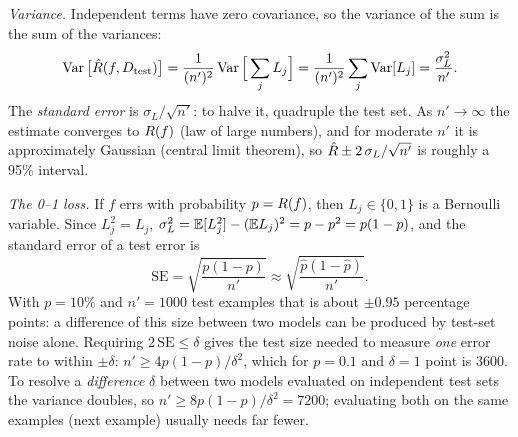 \documentclass[11pt]{article}
\begin{document}
\emph{Variance.} Independent terms have zero covariance, so the variance of the sum is the sum of the variances:
\[
  \operatorname{Var}\big[\hat R(f, D_{\mathrm{test}})\big] = \frac{1}{(n')^2} \operatorname{Var}\Big[\sum_{j} L_j\Big] = \frac{1}{(n')^2} \sum_{j} \operatorname{Var}[L_j]
  = \frac{\sigma_L^2}{n'} .
\]
The \emph{standard error} is $\sigma_L / \sqrt{n'}$: to halve it, quadruple the test set. As $n' \to \infty$ the estimate
converges to $R(f)$ (law of large numbers), and for moderate $n'$ it is approximately Gaussian (central limit
theorem), so $\hat R \pm 2\,\sigma_L/\sqrt{n'}$ is roughly a 95\% interval.

\emph{The 0--1 loss.} If $f$ errs with probability $p = R(f)$, then $L_j \in \{0, 1\}$ is a Bernoulli variable.
Since $L_j^2 = L_j$, $\sigma_L^2 = \mathbb{E}[L_j^2] - (\mathbb{E} L_j)^2 = p - p^2 = p(1 - p)$, and the standard error of a test
error is
\begin{equation}\label{eq:se}
  \mathrm{SE} = \sqrt{\frac{p(1-p)}{n'}} \approx \sqrt{\frac{\hat p(1-\hat p)}{n'}} .
\end{equation}
With $p = 10\%$ and $n' = 1000$ test examples that is about $\pm 0.95$ percentage points: a difference of this size
between two models can be produced by test-set noise alone. Requiring $2\,\mathrm{SE} \le \delta$ gives the test size
needed to measure \emph{one} error rate to within $\pm\delta$: $n' \ge 4p(1-p)/\delta^2$, which for $p = 0.1$ and
$\delta = 1$ point is $3600$. To resolve a \emph{difference} $\delta$ between two models evaluated on independent test
sets the variance doubles, so $n' \ge 8p(1-p)/\delta^2 = 7200$; evaluating both on the same examples (next example)
usually needs far fewer.
\end{document}

